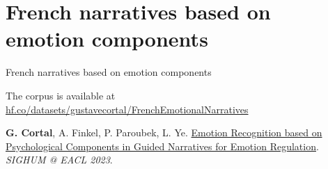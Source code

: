 \documentclass[handout,10pt]{beamer}
\begin{document}

\section{French narratives based on emotion components}

\begin{frame}{}
\Large
\vfill
\begin{center}
    French narratives based on emotion components

    \vfill
\end{center}

\footnotesize{

The corpus is available at \href{https://huggingface.co/datasets/gustavecortal/FrenchEmotionalNarratives}{hf.co/datasets/gustavecortal/FrenchEmotionalNarratives}

\vspace{0.5cm}

\textbf{G. Cortal}, A. Finkel, P. Paroubek, L. Ye. \href{https://aclanthology.org/2023.latechclfl-1.8/}{Emotion Recognition based on Psychological Components in Guided Narratives for Emotion Regulation}. \textit{SIGHUM @ EACL 2023}.}%
\end{frame}
\end{document}
